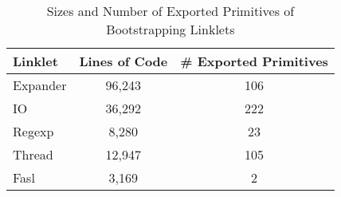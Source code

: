 \begin{table}[!htbp]
  \centering
  \small
  \begin{tabular}{lcc}
    \toprule
    \textbf{Linklet} & \textbf{Lines of Code} & \textbf{\# Exported Primitives} \\
    \midrule \midrule
    Expander & 96,243 & 106 \\
    IO & 36,292 & 222 \\
    Regexp & 8,280 & 23 \\
    Thread & 12,947 & 105 \\
    Fasl & 3,169 & 2 \\
    \bottomrule
  \end{tabular}

  \caption{Sizes and Number of Exported Primitives of Bootstrapping Linklets}
  \label{table:bootstrapping-linklets}
\end{table}
